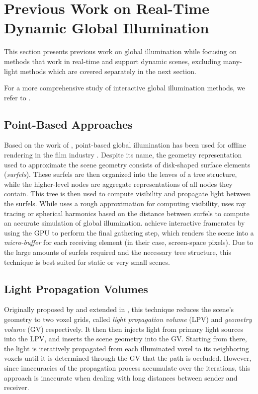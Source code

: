 \section{Previous Work on Real-Time Dynamic Global Illumination}

This section presents previous work on global illumination while focusing on methods that work in real-time and support dynamic scenes, excluding many-light methods which are covered separately in the next section.

For a more comprehensive study of interactive global illumination methods, we refer to \cite{Ritschel:2012:GISTAR}.

\subsection{Point-Based Approaches}

Based on the work of \citet{Bunnell:2005:AO}, point-based global illumination has been used for offline rendering in the film industry \citep{christensen2008point}.
Despite its name, the geometry representation used to approximate the scene geometry consists of disk-shaped surface elements (\emph{surfels}).
These surfels are then organized into the leaves of a tree structure, while the higher-level nodes are aggregate representations of all nodes they contain.
This tree is then used to compute visibility and propagate light between the surfels.
While \citet{Bunnell:2005:AO} uses a rough approximation for computing visibility, \citet{christensen2008point} uses ray tracing or spherical harmonics based on the distance between surfels to compute an accurate simulation of global illumination.
\citet{Ritschel:2009:microrendering} achieve interactive framerates by using the GPU to perform the final gathering step, which renders the scene into a \emph{micro-buffer} for each receiving element (in their case, screen-space pixels).
Due to the large amounts of surfels required and the necessary tree structure, this technique is best suited for static or very small scenes.



\subsection{Light Propagation Volumes}

Originally proposed by \citet{Kaplanyan:2010:LPV} and extended in \citep{Kaplanyan:2010:LPV2}, this technique reduces the scene's geometry to two voxel grids, called \emph{light propagation volume} (LPV) and \emph{geometry volume} (GV) respectively. It then then injects light from primary light sources into the LPV, and inserts the scene geometry into the GV. Starting from there, the light is iteratively propagated from each illuminated voxel to its neighboring voxels until it is determined through the GV that the path is occluded. However, since inaccuracies of the propagation process accumulate over the iterations, this approach is inaccurate when dealing with long distances between sender and receiver.


